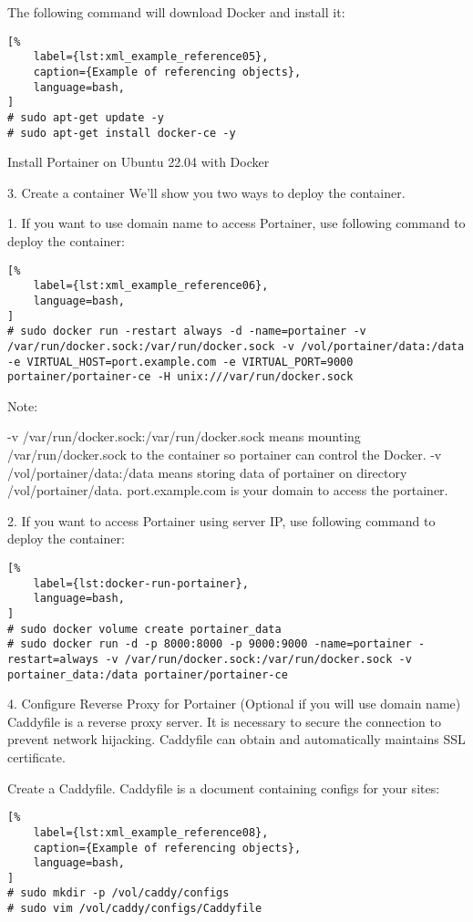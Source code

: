 \documentclass[%
	a4paper,
	oneside,
	listof=numbered,
	parskip=half,
	headsepline=true,
	footsepline=false,
	0.7headlines,
	]{scrbook}
\begin{document}
The following command will download Docker and install it:

\begin{lstlisting}[%
	label={lst:xml_example_reference05},
	caption={Example of referencing objects},
	language=bash,
]
# sudo apt-get update -y
# sudo apt-get install docker-ce -y
\end{lstlisting}

Install Portainer on Ubuntu 22.04 with Docker

3.
Create a container
We’ll show you two ways to deploy the container.

1.
If you want to use domain name to access Portainer, use following command to deploy the container:

\begin{lstlisting}[%
	label={lst:xml_example_reference06},
	language=bash,
]
# sudo docker run -restart always -d -name=portainer -v /var/run/docker.sock:/var/run/docker.sock -v /vol/portainer/data:/data -e VIRTUAL_HOST=port.example.com -e VIRTUAL_PORT=9000 portainer/portainer-ce -H unix:///var/run/docker.sock
\end{lstlisting}


Note:

-v /var/run/docker.sock:/var/run/docker.sock means mounting /var/run/docker.sock to the container so portainer can control the Docker.
-v /vol/portainer/data:/data means storing data of portainer on directory /vol/portainer/data.
port.example.com is your domain to access the portainer.

2.
If you want to access Portainer using server IP, use following command to deploy the container:

\begin{lstlisting}[%
	label={lst:docker-run-portainer},
	language=bash,
]
# sudo docker volume create portainer_data
# sudo docker run -d -p 8000:8000 -p 9000:9000 -name=portainer -restart=always -v /var/run/docker.sock:/var/run/docker.sock -v portainer_data:/data portainer/portainer-ce
\end{lstlisting}


4. Configure Reverse Proxy for Portainer (Optional if you will use domain name)
Caddyfile is a reverse proxy server.
It is necessary to secure the connection to prevent network hijacking.
Caddyfile can obtain and automatically maintains SSL certificate.

Create a Caddyfile.
Caddyfile is a document containing configs for your sites:

\begin{lstlisting}[%
	label={lst:xml_example_reference08},
	caption={Example of referencing objects},
	language=bash,
]
# sudo mkdir -p /vol/caddy/configs
# sudo vim /vol/caddy/configs/Caddyfile
\end{lstlisting}
\end{document}
